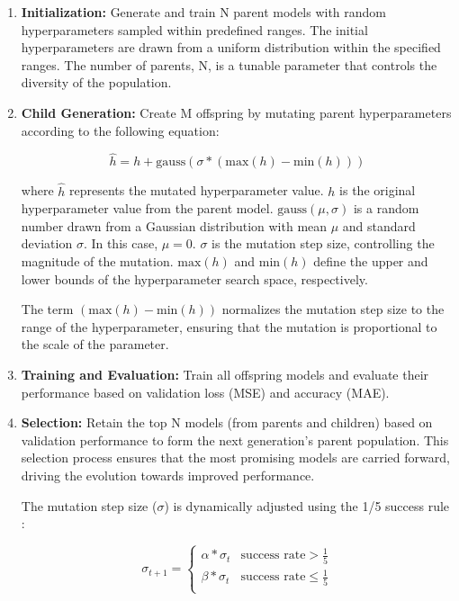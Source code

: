 \documentclass[conference]{IEEEtran}
\begin{document}
\begin{enumerate}

    \item \textbf{Initialization:} Generate and train N parent models with random hyperparameters sampled within predefined ranges. The initial hyperparameters are drawn from a uniform distribution within the specified ranges. The number of parents, N, is a tunable parameter that controls the diversity of the population.

    \item \textbf{Child Generation:} Create M offspring by mutating parent hyperparameters according to the following equation:

          \begin{equation}
              \hat{h} = h + \text{gauss}(\sigma * (\text{max}(h) - \text{min}(h)))
          \end{equation}

          where \(\hat{h}\) represents the mutated hyperparameter value. \(h\) is the original hyperparameter value from the parent model. \(\text{gauss}(\mu, \sigma)\) is a random number drawn from a Gaussian distribution with mean \(\mu\) and standard deviation \(\sigma\).  In this case, \(\mu = 0\). \(\sigma\) is the mutation step size, controlling the magnitude of the mutation. \(\text{max}(h)\) and \(\text{min}(h)\) define the upper and lower bounds of the hyperparameter search space, respectively.

          The term \((\text{max}(h) - \text{min}(h))\) normalizes the mutation step size to the range of the hyperparameter, ensuring that the mutation is proportional to the scale of the parameter.

    \item \textbf{Training and Evaluation:} Train all offspring models and evaluate their performance based on validation loss (MSE) and accuracy (MAE).

    \item \textbf{Selection:} Retain the top N models (from parents and children) based on validation performance to form the next generation's parent population. This selection process ensures that the most promising models are carried forward, driving the evolution towards improved performance.

          The mutation step size (\(\sigma\)) is dynamically adjusted using the 1/5 success rule \cite{ES_one_fifth_rule}:

          \begin{equation}
              \sigma_{t+1} = \left\{
              \begin{array}{ll}
                  \alpha * \sigma_t & \text{success rate} > \frac{1}{5}    \\
                  \beta * \sigma_t  & \text{success rate} \leq \frac{1}{5} \\
              \end{array}
              \right.
          \end{equation}


\end{enumerate}
\end{document}
